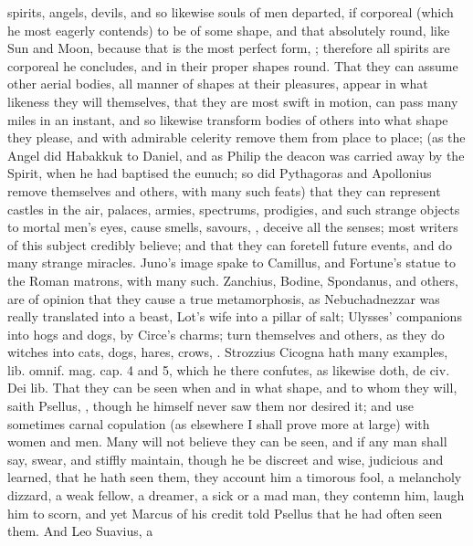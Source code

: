 {{spirits, angels, devils, and so likewise souls of men departed, if
corporeal (which he most eagerly contends) to be of some shape, and
that absolutely round, like Sun and Moon, because that is the most
perfect form, ; therefore all spirits are corporeal he
concludes, and in their proper shapes round. That they can assume other
aerial bodies, all manner of shapes at their pleasures, appear in what
likeness they will themselves, that they are most swift in motion, can
pass many miles in an instant, and so likewise transform bodies
of others into what shape they please, and with admirable celerity
remove them from place to place; (as the Angel did Habakkuk to Daniel,
and as Philip the deacon was carried away by the Spirit, when he had
baptised the eunuch; so did Pythagoras and Apollonius remove themselves
and others, with many such feats) that they can represent castles in
the air, palaces, armies, spectrums, prodigies, and such strange
objects to mortal men's eyes, cause smells, savours, \etc{}, deceive
all the senses; most writers of this subject credibly believe; and that
they can foretell future events, and do many strange miracles. Juno's
image spake to Camillus, and Fortune's statue to the Roman matrons,
with many such. Zanchius, Bodine, Spondanus, and others, are of opinion
that they cause a true metamorphosis, as Nebuchadnezzar was really
translated into a beast, Lot's wife into a pillar of salt; Ulysses'
companions into hogs and dogs, by Circe's charms; turn themselves and
others, as they do witches into cats, dogs, hares, crows, \etc{}. Strozzius
Cicogna hath many examples, lib.  omnif. mag. cap. 4 and 5, which
he there confutes, as \Austin{} likewise doth, de civ. Dei lib. 
That they can be seen when and in what shape, and to whom they will,
saith Psellus, , though he
himself never saw them nor desired it; and use sometimes carnal
copulation (as elsewhere I shall prove more at large) with women
and men. Many will not believe they can be seen, and if any man shall
say, swear, and stiffly maintain, though he be discreet and wise,
judicious and learned, that he hath seen them, they account him a
timorous fool, a melancholy dizzard, a weak fellow, a dreamer, a sick
or a mad man, they contemn him, laugh him to scorn, and yet Marcus of
his credit told Psellus that he had often seen them. And Leo Suavius, a
}}
